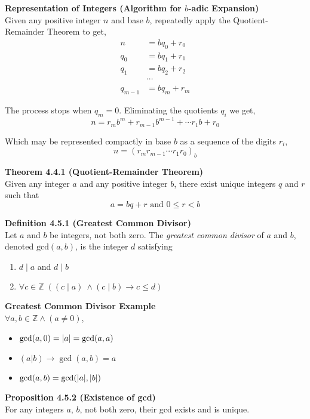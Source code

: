 \documentclass[a4paper]{article}
\newcommand{\subheading}[1]{{\scriptsize\textbf{#1}}}
\begin{document}
\begin{multicols*}{4}
\subheading{Representation of Integers (Algorithm for $b$-adic Expansion)}\\
Given any positive integer $n$ and base $b$, repeatedly apply the
Quotient-Remainder Theorem to get,
\begin{eqnarray*}
	n   &= bq_0 + r_0 \\
	q_0 &= bq_1 + r_1 \\
	q_1 &= bq_2 + r_2 \\
	& \cdots \\
	q_{m-1} &= bq_m + r_m
\end{eqnarray*}

The process stops when $q_m = 0$. Eliminating the quotients $q_i$ we get,
$$ n = r_mb^m + r_{m-1}b^{m-1} + \cdots r_1b + r_0 $$

Which may be represented compactly in base $b$ as a sequence of the digits
$r_i$,
$$ n = (r_m r_{m-1} \cdots r_1 r_0)_b $$


\subheading{Theorem 4.4.1 (Quotient-Remainder Theorem)}\\
Given any integer $a$ and any positive integer $b$, there exist unique integers
$q$ and $r$ such that $$ a = bq + r \text{ and } 0 \leq r < b$$

\subheading{Definition 4.5.1 (Greatest Common Divisor)}\\
Let $a$ and $b$ be integers, not both zero. The \textit{greatest common divisor}
of $a$ and $b$, denoted $\mathrm{gcd}(a, b)$, is the integer $d$ satisfying

\begin{enumerate} \itemsep -0.5em
	\item $d\;|\;a$ and $d\;|\;b$
	\item $\forall c \in \mathbb{Z}\;((c\;|\;a)\ \land (c\;|\;b) \rightarrow c \leq d)$
\end{enumerate}

\subheading{Greatest Common Divisor Example}\\
$\forall a, b \in \mathbb{Z} \land (a \ne 0)$,
\begin{itemize}[leftmargin=*] \itemsep -0.3em
	\item $\gcd(a, 0) = \abs{a} = \gcd(a, a)$
	\item $(a | b) \rightarrow \gcd(a, b) = a$
	\item $\gcd(a, b)  = \gcd(\abs{a}, \abs{b})$
\end{itemize}

\subheading{Proposition 4.5.2 (Existence of gcd)}\\
For any integers $a$, $b$, not both zero, their gcd exists and is unique.\\


\end{multicols*}
\end{document}
